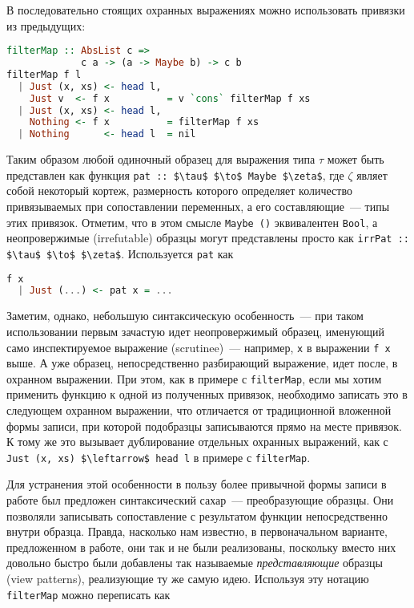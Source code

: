 В последовательно стоящих охранных выражениях можно использовать привязки из предыдущих:

\noindent
\begin{minipage}{\linewidth}
\begin{lstlisting}[language=haskell]
filterMap :: AbsList c => 
             c a -> (a -> Maybe b) -> c b
filterMap f l
  | Just (x, xs) <- head l, 
    Just v  <- f x          = v `cons` filterMap f xs
  | Just (x, xs) <- head l,
    Nothing <- f x          = filterMap f xs
  | Nothing      <- head l  = nil
\end{lstlisting}
\end{minipage}

Таким образом любой одиночный образец для выражения типа $ \tau $ может быть представлен как функция \lstinline[breaklines]|pat :: $\tau$ $\to$ Maybe $\zeta$|, где $ \zeta $ являет собой некоторый кортеж, размерность которого определяет количество привязываемых при сопоставлении переменных, а его составляющие~--- типы этих привязок. Отметим, что в этом смысле \lstinline[breaklines]|Maybe ()| эквивалентен \lstinline[breaklines]|Bool|, а неопровержимые (irrefutable) образцы могут представлены просто как \lstinline[breaklines]|irrPat :: $\tau$ $\to$ $\zeta$|. Используется \lstinline|pat| как

\noindent
\begin{minipage}{\linewidth}
\begin{lstlisting}[language=haskell]
f x
  | Just (...) <- pat x = ...
\end{lstlisting}
\end{minipage}

Заметим, однако, небольшую синтаксическую особенность~--- при таком использовании первым зачастую идет неопровержимый образец, именующий само инспектируемое выражение (scrutinee)~--- например, \lstinline|x| в выражении \lstinline|f x| выше. А уже образец, непосредственно разбирающий выражение, идет после, в охранном выражении. При этом, как в примере с \lstinline|filterMap|, если мы хотим применить функцию к одной из полученных привязок, необходимо записать это в следующем охранном выражении, что отличается от традиционной вложенной формы записи, при которой подобразцы записываются прямо на месте привязок. К тому же это вызывает дублирование отдельных охранных выражений, как с \lstinline[breaklines]|Just (x, xs) $\leftarrow$ head l| в примере с \lstinline|filterMap|.

Для устранения этой особенности в пользу более привычной формы записи в работе был предложен синтаксический сахар~--- преобразующие образцы. Они позволяли записывать сопоставление с результатом функции непосредственно внутри образца. Правда, насколько нам известно, в первоначальном варианте, предложенном в работе, они так и не были реализованы, поскольку вместо них довольно быстро были добавлены так называемые \textit{представляющие} образцы (view patterns), реализующие ту же самую идею. Используя эту нотацию \lstinline|filterMap| можно переписать как 


